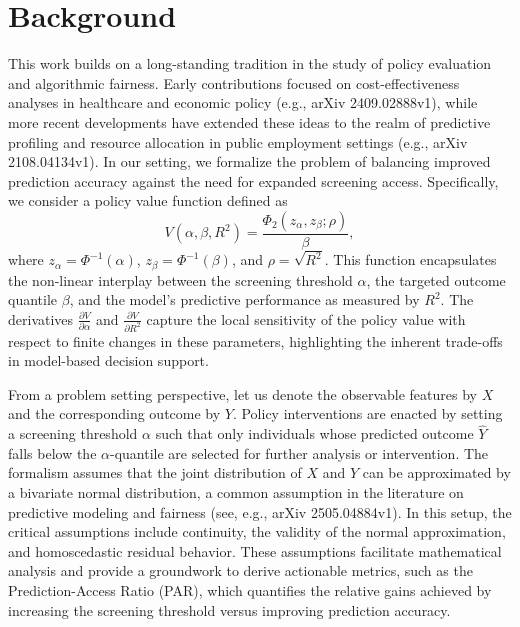 \documentclass{article}
\begin{document}
\section{Background}
This work builds on a long-standing tradition in the study of policy evaluation and algorithmic fairness. Early contributions focused on cost-effectiveness analyses in healthcare and economic policy (e.g., arXiv 2409.02888v1), while more recent developments have extended these ideas to the realm of predictive profiling and resource allocation in public employment settings (e.g., arXiv 2108.04134v1). In our setting, we formalize the problem of balancing improved prediction accuracy against the need for expanded screening access. Specifically, we consider a policy value function defined as 
\[
V(\alpha,\beta,R^2)=\frac{\Phi_2(z_\alpha,z_\beta;\rho)}{\beta},
\]
where \(z_\alpha=\Phi^{-1}(\alpha)\), \(z_\beta=\Phi^{-1}(\beta)\), and \(\rho=\sqrt{R^2}\). This function encapsulates the non-linear interplay between the screening threshold \(\alpha\), the targeted outcome quantile \(\beta\), and the model's predictive performance as measured by \(R^2\). The derivatives \(\frac{\partial V}{\partial\alpha}\) and \(\frac{\partial V}{\partial R^2}\) capture the local sensitivity of the policy value with respect to finite changes in these parameters, highlighting the inherent trade-offs in model-based decision support.

From a problem setting perspective, let us denote the observable features by \(X\) and the corresponding outcome by \(Y\). Policy interventions are enacted by setting a screening threshold \(\alpha\) such that only individuals whose predicted outcome \( \hat{Y} \) falls below the \(\alpha\)-quantile are selected for further analysis or intervention. The formalism assumes that the joint distribution of \(X\) and \(Y\) can be approximated by a bivariate normal distribution, a common assumption in the literature on predictive modeling and fairness (see, e.g., arXiv 2505.04884v1). In this setup, the critical assumptions include continuity, the validity of the normal approximation, and homoscedastic residual behavior. These assumptions facilitate mathematical analysis and provide a groundwork to derive actionable metrics, such as the Prediction-Access Ratio (PAR), which quantifies the relative gains achieved by increasing the screening threshold versus improving prediction accuracy.
\end{document}

